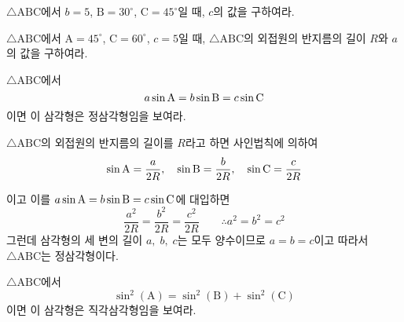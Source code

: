 \documentclass[11pt, a4paper]{book}
\begin{document}
\begin{problem}
	$\triangle \textrm{ABC}$에서 $b=5$, $\textrm{B}=30^{\circ}$, $\textrm{C}=45^{\circ}$일 때, $c$의 값을 구하여라.
\end{problem}
\vspace{1em}
\begin{problem}
	$\triangle \textrm{ABC}$에서 $\textrm{A}=45^{\circ}$, $\textrm{C}=60^{\circ}$, $c=5$일 때, $\triangle \textrm{ABC}$의 외접원의 반지름의 길이 $R$와 $a$의 값을 구하여라.
\end{problem}
\vspace{1em}
\begin{example}
	$\triangle \textrm{ABC}$에서
	\[
	a \sin \textrm{A} = b \sin \textrm{B} = c \sin \textrm{C}
	\]
	이면 이 삼각형은 정삼각형임을 보여라.
	\begin{solution}
		$\triangle \textrm{ABC}$의 외접원의 반지름의 길이를 $R$라고 하면 사인법칙에 의하여
		\[
		\sin \textrm{A} =\frac{a}{2R}, \quad	\sin \textrm{B} =\frac{b}{2R}, \quad 	\sin \textrm{C} =\frac{c}{2R}
		\]
	\end{solution}
이고 이를 $a \sin \textrm{A}=b \sin \textrm{B} = c \sin \textrm{C}$에 대입하면
\[
\frac{a^2}{2R} =\frac{b^2}{2R} =\frac{c^2}{2R} \qquad \therefore a^2=b^2=c^2
\]
그런데 삼각형의 세 변의 길이 $a,\;b,\;c$는 모두 양수이므로 $a=b=c$이고 따라서 $\triangle \textrm{ABC}$는 정삼각형이다.
\end{example}
\vspace{1em}
\begin{problem}
	$\triangle \textrm{ABC}$에서
	\[
	\sin^2(\textrm{A}) = \sin^2(\textrm{B}) + \sin^2(\textrm{C})
	\]
	이면 이 삼각형은 직각삼각형임을 보여라.
\end{problem}
\end{document}
